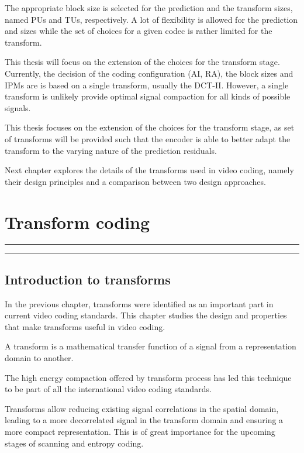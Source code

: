 \documentclass[11pt,a4paper,openright,twoside]{book}
\providecommand{\chaptertoc}{
	\startcontents[chapters]
	\hrule
	\vspace{1em}
	\printcontents[chapters]{}{1}{{\sf\large\bfseries Contents}}
	\hrule
}
\numberwithin{equation}{section} %
\numberwithin{figure}{section} %
\numberwithin{table}{section} %
\begin{document}
The appropriate block size is selected for the prediction and the transform
sizes, named \acp{PU} and \acp{TU}, respectively.
A lot of flexibility is allowed for the prediction and sizes while the set of
choices for a given codec is rather limited for the transform.

This thesis will focus on the extension of the choices for the transform
stage.
Currently, the decision of the coding configuration (\ac{AI}, \ac{RA}), the
block sizes and \acp{IPM} are is based on a single transform, usually the
\ac{DCT}-II.
However, a single transform is unlikely provide optimal signal compaction for
all kinds of possible signals.

This thesis focuses on the extension of the choices for the transform
stage, as set of transforms will be provided such that the encoder is able to
better adapt the transform to the varying nature of the prediction residuals.

Next chapter explores the details of the transforms used in video coding,
namely their design principles and a comparison between two design approaches.

\chapter{Transform coding}
\label{cha:transform_coding}
\chaptertoc

\section{Introduction to transforms}
\label{sec:introduction_to_transforms}

In the previous chapter, transforms were identified as an important part in
current video coding standards.
This chapter studies the design and properties that make transforms useful in
video coding.

A transform is a mathematical transfer function of a signal from a
representation domain to another.

The high energy compaction offered by transform process has led this technique
to be part of all the international video coding standards.

Transforms allow reducing existing signal correlations in the spatial domain,
leading to a more decorrelated signal in the transform domain and ensuring a
more compact representation.
This is of great importance for the upcoming stages of scanning and entropy
coding.
\end{document}
